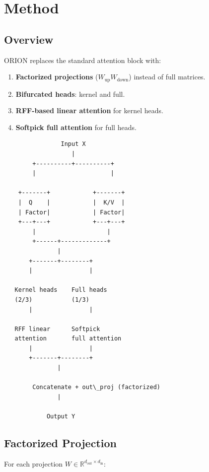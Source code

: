 
\section{Method}

\subsection{Overview}

ORION replaces the standard attention block with:

\begin{enumerate}
\item \textbf{Factorized projections} ($W_\text{up} W_\text{down}$) instead of full
  matrices.
\item \textbf{Bifurcated heads}: kernel and full.
\item \textbf{RFF-based linear attention} for kernel heads.
\item \textbf{Softpick full attention} for full heads.

\end{enumerate}
\begin{lstlisting}
                Input X
                   |
        +----------+----------+
        |                     |
                               
    +-------+            +-------+
    |  Q    |            |  K/V  |
    | Factor|            | Factor|
    +---+---+            +---+---+
        |                    |
        +------+-------------+
               |
       +-------+--------+
       |                |
                         
   Kernel heads    Full heads
   (2/3)           (1/3)
       |                |
                         
   RFF linear      Softpick
   attention       full attention
       |                |
       +-------+--------+
               |
                
        Concatenate + out\_proj (factorized)
               |
                
            Output Y
\end{lstlisting}

\subsection{Factorized Projection}

For each projection $W \in \mathbb{R}^{d_\text{out} \times d_\text{in}}$:

